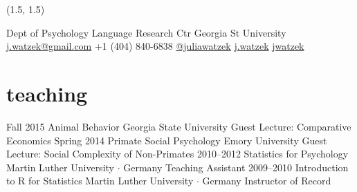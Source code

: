 \documentclass[]{friggeri-cv}
\begin{document}
\renewenvironment{aside}{%
  \let\oldsection\section
  \renewcommand{\section}[1]{
    \par\vspace{\baselineskip}{\Large\headingfont\color{headercolor} ##1}
  }
  \begin{textblock}{3.6}(1.5, 1.5)
  \begin{flushright}
  \obeycr
}{%
  \restorecr
  \end{flushright}
  \end{textblock}
  \let\section\oldsection
}


\begin{aside}
  \section{{\normalfont julia}watzek}
    Dept of Psychology
    Language Research Ctr
    Georgia St University
    ~
    \href{mailto:j.watzek@gmail.com}{j.watzek@gmail.com}
    +1 (404) 840-6838
    \faTw{} \href{http://www.twitter.com/juliawatzek}{@juliawatzek}
    \faSkype{} \href{Skype:j.watzek?call}{j.watzek}
    \faGit{} \href{https?//github.com/jwatzek}{jwatzek}
\end{aside}


\newpage
\thispagestyle{fancy}

\section{teaching}

\begin{entrylist}
  \entry
    {Fall 2015}
    {Animal Behavior}
    {Georgia State University}
    {Guest Lecture: Comparative Economics}
  \entry
    {Spring 2014}
    {Primate Social Psychology}
    {Emory University}
    {Guest Lecture: Social Complexity of Non-Primates}
  \entry
    {2010--2012}
    {Statistics for Psychology}
    {Martin Luther University $\cdot$ Germany}
    {Teaching Assistant}
  \entry
    {2009--2010}
    {Introduction to R for Statistics}
    {Martin Luther University $\cdot$ Germany}
    {Instructor of Record}
\end{entrylist}
\end{document}
